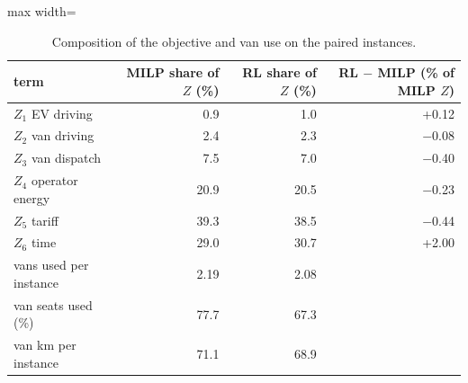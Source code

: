 \begin{table}[H]\centering
\small
\caption{Composition of the objective and van use on the paired instances.}\label{tab:compm}
\begin{adjustbox}{max width=\textwidth}\begin{tabular}{lrrr}\toprule
term & MILP share of $Z$ (\%) & RL share of $Z$ (\%) & RL $-$ MILP (\% of MILP $Z$) \\ \midrule
$Z_1$ EV driving & 0.9 & 1.0 & +0.12 \\
$Z_2$ van driving & 2.4 & 2.3 & $-$0.08 \\
$Z_3$ van dispatch & 7.5 & 7.0 & $-$0.40 \\
$Z_4$ operator energy & 20.9 & 20.5 & $-$0.23 \\
$Z_5$ tariff & 39.3 & 38.5 & $-$0.44 \\
$Z_6$ time & 29.0 & 30.7 & +2.00 \\
vans used per instance & 2.19 & 2.08 &  \\
van seats used (\%) & 77.7 & 67.3 &  \\
van km per instance & 71.1 & 68.9 &  \\
\bottomrule\end{tabular}\end{adjustbox}\end{table}
